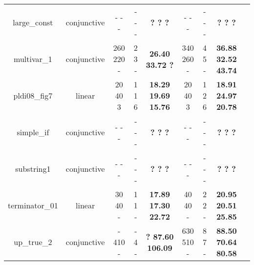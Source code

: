 \begin{table}[t]
\begin{tabular}{l c | c c c | c c c | c }
\multicolumn{1}{|c|}{large\_const}		&conjunctive		&- - - &- - -&\textbf{? ? ?}				&- - - &- - -  &\textbf{? ? ?}					&\multicolumn{1}{|c|}{\cmark} \\
\multicolumn{1}{|c|}{multivar\_1}		&conjunctive		&260 220 - &2 3 -&\textbf{26.40 33.72 ?}		&340 260 - &4 5 -  &\textbf{36.88 32.52 43.74}		&\multicolumn{1}{|c|}{\cmark} \\
\multicolumn{1}{|c|}{pldi08\_fig7}		&linear 			&20 40 3 &1 1 6 &\textbf{18.29 19.69 15.76}	&20 40 3 &1 2 6   &\textbf{18.91 24.97 20.78}		&\multicolumn{1}{|c|}{\cmark} \\
\multicolumn{1}{|c|}{simple\_if}		&conjunctive		&- - - &- - -&\textbf{? ? ?}				&- - - &- - -  &\textbf{? ? ?}					&\multicolumn{1}{|c|}{\cmark} \\
\multicolumn{1}{|c|}{substring1}		&conjunctive		&- - - &- - -&\textbf{? ? ?}				&- - - &- - -  &\textbf{? ? ?}					&\multicolumn{1}{|c|}{\cmark} \\
\multicolumn{1}{|c|}{terminator\_01}	&linear 			&30 40 - &1 1 -&\textbf{17.89 17.30 22.72}	&40 40 - &2 2 -  &\textbf{20.95 20.51 25.85}		&\multicolumn{1}{|c|}{\cmark} \\
\multicolumn{1}{|c|}{up\_true\_2}		&conjunctive		&- 410 - &- 4 -&\textbf{? 87.60 106.09}		&630 510 - &8 7 -  &\textbf{88.50 70.64 80.58}		&\multicolumn{1}{|c|}{\cmark} \\


\end{tabular}
\end{table}
